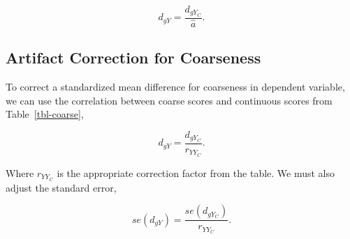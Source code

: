 \documentclass[
  letterpaper,
  DIV=11,
  numbers=noendperiod]{scrreprt}
\begin{document}
\[
d_{gY} = \frac{d_{gY_C}}{\hat{a}}.
\]

\subsection{Artifact Correction for
Coarseness}\label{artifact-correction-for-coarseness}

To correct a standardized mean difference for coarseness in dependent
variable, we can use the correlation between coarse scores and
continuous scores from Table~\ref{tbl-coarse},

\[
d_{gY} = \frac{d_{gY_C}}{r_{YY_C}}.
\]

Where \(r_{YY_C}\) is the appropriate correction factor from the table.
We must also adjust the standard error,

\[
se(d_{gY}) = \frac{se(d_{gY_C})}{r_{YY_C}}.
\]
\end{document}
